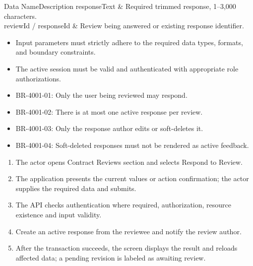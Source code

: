 
\begin{specdatatable}{Data Name}{Description}
responseText & Required trimmed response, 1--3,000 characters.\\ \hline
reviewId / responseId & Review being answered or existing response identifier.\\ \hline
\end{specdatatable}

\begin{itemize}[leftmargin=1.6em,topsep=3pt,itemsep=2pt,parsep=0pt,label=$\bullet$]
    \item Input parameters must strictly adhere to the required data types, formats, and boundary constraints.
    \item The active session must be valid and authenticated with appropriate role authorizations.
\end{itemize}

\begin{itemize}[leftmargin=1.6em,topsep=3pt,itemsep=2pt,parsep=0pt,label=$\bullet$]\brrulelist
    \item BR-4001-01: Only the user being reviewed may respond.
    \item BR-4001-02: There is at most one active response per review.
    \item BR-4001-03: Only the response author edits or soft-deletes it.
    \item BR-4001-04: Soft-deleted responses must not be rendered as active feedback.
\end{itemize}

\begin{enumerate}[leftmargin=1.8em,topsep=3pt,itemsep=2pt,parsep=0pt]
    \item The actor opens Contract Reviews section and selects Respond to Review.
    \item The application presents the current values or action confirmation; the actor supplies the required data and submits.
    \item The API checks authentication where required, authorization, resource existence and input validity.
    \item Create an active response from the reviewee and notify the review author.
    \item After the transaction succeeds, the screen displays the result and reloads affected data; a pending revision is labeled as awaiting review.
\end{enumerate}

